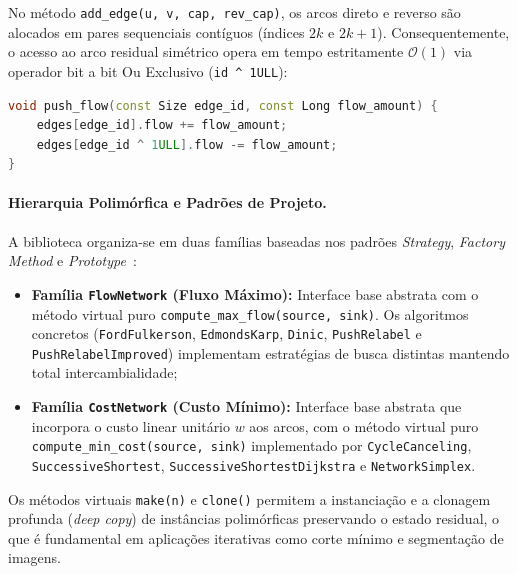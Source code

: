 No método \lstinline{add_edge(u, v, cap, rev_cap)}, os arcos direto e reverso são alocados em pares sequenciais contíguos (índices $2k$ e $2k+1$). Consequentemente, o acesso ao arco residual simétrico opera em tempo estritamente $\mathcal{O}(1)$ via operador bit a bit Ou Exclusivo (\lstinline{id ^ 1ULL}):
\begin{lstlisting}[language=C++, numbers=none, basicstyle=\ttfamily\footnotesize, frame=none, backgroundcolor=\color{white}]
void push_flow(const Size edge_id, const Long flow_amount) {
    edges[edge_id].flow += flow_amount;
    edges[edge_id ^ 1ULL].flow -= flow_amount;
}
\end{lstlisting}

\paragraph{Hierarquia Polimórfica e Padrões de Projeto.}
A biblioteca organiza-se em duas famílias baseadas nos padrões \textit{Strategy}, \textit{Factory Method} e \textit{Prototype}~\cite{gamma1994design}:
\begin{itemize}
    \item \textbf{Família \lstinline{FlowNetwork} (Fluxo Máximo):} Interface base abstrata com o método virtual puro \lstinline{compute_max_flow(source, sink)}. Os algoritmos concretos (\lstinline{FordFulkerson}, \lstinline{EdmondsKarp}, \lstinline{Dinic}, \lstinline{PushRelabel} e \lstinline{PushRelabelImproved}) implementam estratégias de busca distintas mantendo total intercambialidade;
    \item \textbf{Família \lstinline{CostNetwork} (Custo Mínimo):} Interface base abstrata que incorpora o custo linear unitário $w$ aos arcos, com o método virtual puro \lstinline{compute_min_cost(source, sink)} implementado por \lstinline{CycleCanceling}, \lstinline{SuccessiveShortest}, \lstinline{SuccessiveShortestDijkstra} e \lstinline{NetworkSimplex}.
\end{itemize}

Os métodos virtuais \lstinline{make(n)} e \lstinline{clone()} permitem a instanciação e a clonagem profunda (\textit{deep copy}) de instâncias polimórficas preservando o estado residual, o que é fundamental em aplicações iterativas como corte mínimo e segmentação de imagens.
